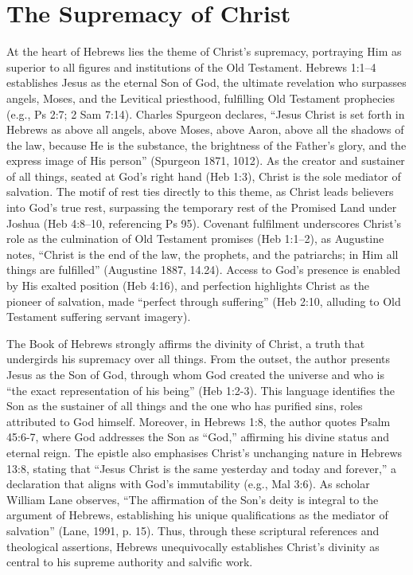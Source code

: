 \documentclass[12pt]{article}
\begin{document}
\section{The Supremacy of Christ}
At the heart of Hebrews lies the theme of Christ’s supremacy, portraying Him as
superior to all figures and institutions of the Old Testament. Hebrews 1:1--4
establishes Jesus as the eternal Son of God, the ultimate revelation who
surpasses angels, Moses, and the Levitical priesthood, fulfilling Old Testament
prophecies (e.g., Ps 2:7; 2 Sam 7:14). Charles Spurgeon declares, ``Jesus
Christ is set forth in Hebrews as above all angels, above Moses, above Aaron,
above all the shadows of the law, because He is the substance, the brightness
of the Father’s glory, and the express image of His person'' (Spurgeon 1871,
1012). As the creator and sustainer of all things, seated at God’s right hand
(Heb 1:3), Christ is the sole mediator of salvation. The motif of rest ties
directly to this theme, as Christ leads believers into God’s true rest,
surpassing the temporary rest of the Promised Land under Joshua (Heb 4:8--10,
referencing Ps 95). Covenant fulfilment underscores Christ’s role as the
culmination of Old Testament promises (Heb 1:1--2), as Augustine notes,
``Christ is the end of the law, the prophets, and the patriarchs; in Him all
things are fulfilled'' (Augustine 1887, 14.24). Access to God’s presence is
enabled by His exalted position (Heb 4:16), and perfection highlights Christ as
the pioneer of salvation, made ``perfect through suffering'' (Heb 2:10,
alluding to Old Testament suffering servant imagery).

The Book of Hebrews strongly affirms the divinity of Christ, a truth that
undergirds his supremacy over all things. From the outset, the author presents
Jesus as the Son of God, through whom God created the universe and who is ``the
exact representation of his being'' (Heb 1:2-3). This language identifies the
Son as the sustainer of all things and the one who has purified sins, roles
attributed to God himself. Moreover, in Hebrews 1:8, the author quotes Psalm
45:6-7, where God addresses the Son as ``God,'' affirming his divine status and
eternal reign. The epistle also emphasises Christ’s unchanging nature in Hebrews
13:8, stating that ``Jesus Christ is the same yesterday and today and forever,''
a declaration that aligns with God’s immutability (e.g., Mal 3:6). As scholar
William Lane observes, ``The affirmation of the Son’s deity is integral to the
argument of Hebrews, establishing his unique qualifications as the mediator of
salvation'' (Lane, 1991, p. 15). Thus, through these scriptural references and
theological assertions, Hebrews unequivocally establishes Christ’s divinity as
central to his supreme authority and salvific work.
\end{document}
